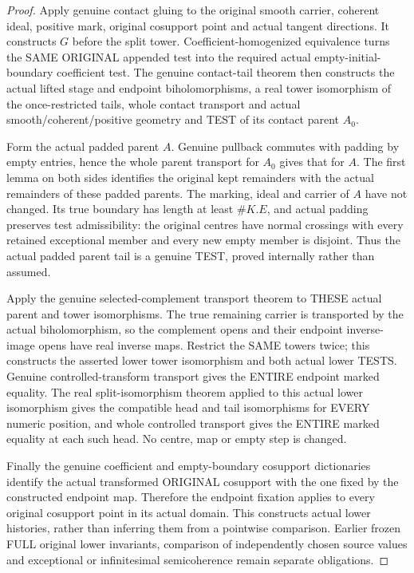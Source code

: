\begin{proof}
Apply genuine contact gluing to the original smooth carrier, coherent ideal,
positive mark, original cosupport point and actual tangent directions. It
constructs $G$ before the split tower. Coefficient-homogenized equivalence
turns the SAME ORIGINAL appended test into the required actual empty-initial-
boundary coefficient test. The genuine contact-tail theorem then constructs
the actual lifted stage and endpoint biholomorphisms, a real tower
isomorphism of the once-restricted tails, whole contact transport and actual
smooth/coherent/positive geometry and TEST of its contact parent $A_0$.

Form the actual padded parent $A$. Genuine pullback commutes with padding
by empty entries, hence the whole parent transport for $A_0$ gives that for
$A$. The first lemma on both sides identifies the original kept remainders
with the actual remainders of these padded parents. The marking, ideal and
carrier of $A$ have not changed. Its true boundary has length at least
$\#K.E$, and actual padding preserves test admissibility: the original
centres have normal crossings with every retained exceptional member and
every new empty member is disjoint. Thus the actual padded parent tail is
a genuine TEST, proved internally rather than assumed.

Apply the genuine selected-complement transport theorem to THESE actual
parent and tower isomorphisms. The true remaining carrier is transported by
the actual biholomorphism, so the complement opens and their endpoint
inverse-image opens have real inverse maps. Restrict the SAME towers twice;
this constructs the asserted lower tower isomorphism and both actual lower
TESTS. Genuine controlled-transform transport gives the ENTIRE endpoint
marked equality. The real split-isomorphism theorem applied to this actual
lower isomorphism gives the compatible head and tail isomorphisms for EVERY
numeric position, and whole controlled transport gives the ENTIRE marked
equality at each such head. No centre, map or empty step is changed.

Finally the genuine coefficient and empty-boundary cosupport dictionaries
identify the actual transformed ORIGINAL cosupport with the one fixed by
the constructed endpoint map. Therefore the endpoint fixation applies to
every original cosupport point in its actual domain. This constructs actual
lower histories, rather than inferring them from a pointwise comparison.
Earlier frozen FULL original lower invariants, comparison of independently
chosen source values and exceptional or infinitesimal semicoherence remain
separate obligations.
\end{proof}
